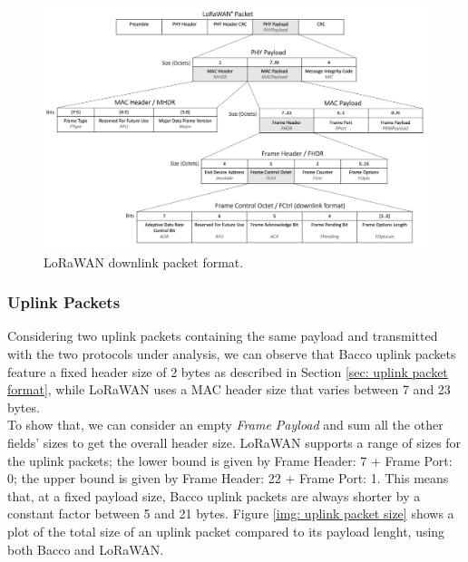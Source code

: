 \begin{figure}[ht]
    \centering
    \includegraphics[width=1.0\textwidth, trim={0 0 0 115pt}, clip]{uml/lorawan_downlink_format.pdf}
    \caption{LoRaWAN downlink packet format.}
    \label{img: lorawan downlink format}
\end{figure}

\subsubsection{Uplink Packets}
\label{subsec: bacco and lorawan uplink packet format}
Considering two uplink packets containing the same payload and transmitted with the two protocols under
analysis, we can observe that Bacco uplink packets feature a fixed header size of 2 bytes as described in Section \ref{sec:
uplink packet format}, while LoRaWAN uses a \gls{MAC} header size that varies between 7 and 23 bytes.\\
To show that, we can consider an empty \textit{Frame Payload} and sum all the other
fields' sizes to get the overall header size. LoRaWAN supports a range of sizes for the uplink packets; the lower bound
is given by Frame Header: 7 + Frame Port: 0; the upper bound is given by Frame Header: 22 + Frame Port: 1. This means
that, at a fixed payload size, Bacco uplink packets are always shorter by a constant factor between 5 and 21 bytes.
Figure \ref{img: uplink packet size} shows a plot of the total size of an uplink packet compared to its payload lenght,
using both Bacco and LoRaWAN.

